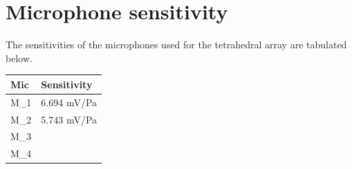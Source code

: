 \section{Microphone sensitivity}
The sensitivities of the microphones used for the tetrahedral array are tabulated below.
\begin{table}
    \begin{tabular}{ll} \toprule
	{Mic}	&	{Sensitivity}\\
	    \bottomrule 
	    M_1   &   6.694 mV/Pa                   \\
	    M_2   &   5.743 mV/Pa                        \\
	    M_3   &                                 \\
		M_4   &                                 \\
		\bottomrule 
	\end{tabular}
\end{table}